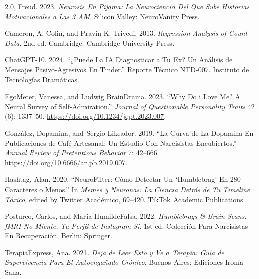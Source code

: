 \documentclass[
]{article}
\newlength{\cslhangindent}
\newenvironment{CSLReferences}[2] %
 {\begin{list}{}{%
  \setlength{\itemindent}{0pt}
  \setlength{\leftmargin}{0pt}
  \setlength{\parsep}{0pt}
  \ifodd #1
   \setlength{\leftmargin}{\cslhangindent}
   \setlength{\itemindent}{-1\cslhangindent}
  \fi
  \setlength{\itemsep}{#2\baselineskip}}}
 {\end{list}}
\begin{document}
\label{refs}
\begin{CSLReferences}{1}{0}
2.0, Freud. 2023. \emph{Neurosis En Pijama: La Neurociencia Del Que Sube
Historias Motivacionales a Las 3 AM}. Silicon Valley: NeuroVanity Press.

Cameron, A. Colin, and Pravin K. Trivedi. 2013. \emph{Regression
Analysis of Count Data}. 2nd ed. Cambridge: Cambridge University Press.

ChatGPT-10. 2024. {``¿Puede La {IA} Diagnosticar a Tu Ex? Un Análisis de
Mensajes Pasivo-Agresivos En Tinder.''} Reporte Técnico NTD-007.
Instituto de Tecnologías Dramáticas.

EgoMeter, Vanessa, and Ludwig BrainDrama. 2023. {``Why Do i Love Me? A
Neural Survey of Self-Admiration.''} \emph{Journal of Questionable
Personality Traits} 42 (6): 1337--50.
\url{https://doi.org/10.1234/jqpt.2023.007}.

González, Dopamina, and Sergio Likeador. 2019. {``La Curva de La
Dopamina En Publicaciones de Café Artesanal: Un Estudio Con Narcisistas
Encubiertos.''} \emph{Annual Review of Pretentious Behavior} 7: 42--666.
\url{https://doi.org/10.6666/ar.pb.2019.007}.

Hashtag, Alan. 2020. {``NeuroFilter: Cómo Detectar Un {{`Humblebrag'}}
En 280 Caracteres o Menos.''} In \emph{Memes y Neuronas: La Ciencia
Detrás de Tu Timeline Tóxico}, edited by Twitter Académico, 69--420.
TikTok Academic Publications.

Postureo, Carlos, and María HumildeFalsa. 2022. \emph{Humblebrags \&
Brain Scans: {fMRI} No Miente, Tu Perfil de Instagram Sí}. 1st ed.
Colección Para Narcisistas En Recuperación. Berlin: Springer.

TerapiaExpress, Ana. 2021. \emph{Deja de Leer Esto y Ve a Terapia: Guía
de Supervivencia Para El Autoengañado Crónico}. Buenos Aires: Ediciones
Ironía Sana.

\end{CSLReferences}
\end{document}
